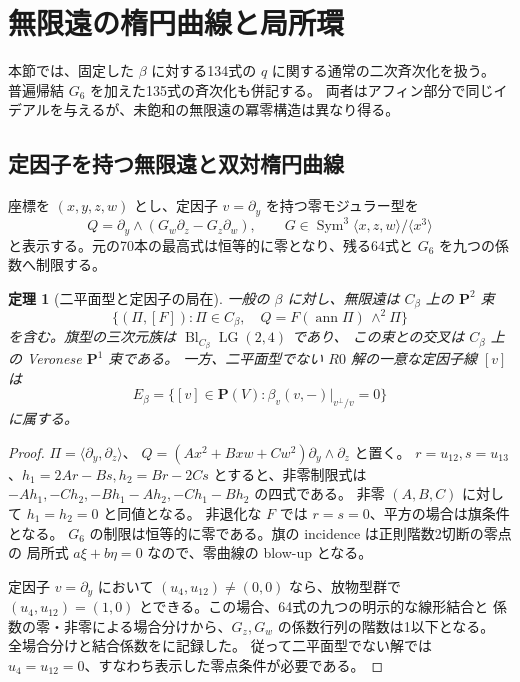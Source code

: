 \documentclass[11pt,a4paper]{ltjsarticle}
\newcommand{\PP}{\mathbf P}
\newtheorem{theorem}{定理}[section]
\theoremstyle{remark}
\begin{document}
\section{無限遠の楕円曲線と局所環}\label{sec:infinity-v32}
本節では、固定した $\beta$ に対する134式の $q$ に関する通常の二次斉次化を扱う。
普遍帰結 $G_6$ を加えた135式の斉次化も併記する。
両者はアフィン部分で同じイデアルを与えるが、未飽和の無限遠の冪零構造は異なり得る。

\subsection{定因子を持つ無限遠と双対楕円曲線}
座標を $(x,y,z,w)$ とし、定因子 $v=\partial_y$ を持つ零モジュラー型を
\[
 Q=\partial_y\wedge(G_w\partial_z-G_z\partial_w),\qquad
 G\in\operatorname{Sym}^3\langle x,z,w\rangle/\langle x^3\rangle
\]
と表示する。元の70本の最高式は恒等的に零となり、残る64式と $G_6$ を九つの係数へ制限する。

\begin{theorem}[二平面型と定因子の局在]
一般の $\beta$ に対し、無限遠は $C_\beta$ 上の $\PP^2$ 束
\[
 \{(\Pi,[F]):\Pi\in C_\beta,\quad
 Q=F(\operatorname{ann}\Pi)\,\wedge^2\Pi\}
\]
を含む。旗型の三次元族は $\operatorname{Bl}_{C_\beta}\operatorname{LG}(2,4)$ であり、
この束との交叉は $C_\beta$ 上の Veronese $\PP^1$ 束である。
一方、二平面型でない $R0$ 解の一意な定因子線 $[v]$ は
\[
 E_\beta=\{[v]\in\PP(V):\beta_v(v,-)|_{v^\perp/v}=0\}
\]
に属する。
\end{theorem}
\begin{proof}
$\Pi=\langle\partial_y,\partial_z\rangle$、
$Q=(Ax^2+Bxw+Cw^2)\partial_y\wedge\partial_z$ と置く。
$r=u_{12},s=u_{13}$、$h_1=2Ar-Bs,h_2=Br-2Cs$ とすると、非零制限式は
$-Ah_1,-Ch_2,-Bh_1-Ah_2,-Ch_1-Bh_2$ の四式である。
非零 $(A,B,C)$ に対して $h_1=h_2=0$ と同値となる。
非退化な $F$ では $r=s=0$、平方の場合は旗条件となる。
$G_6$ の制限は恒等的に零である。旗の incidence は正則階数2切断の零点の
局所式 $a\xi+b\eta=0$ なので、零曲線の blow-up となる。

定因子 $v=\partial_y$ において $(u_4,u_{12})\ne(0,0)$ なら、放物型群で
$(u_4,u_{12})=(1,0)$ とできる。この場合、64式の九つの明示的な線形結合と
係数の零・非零による場合分けから、$G_z,G_w$ の係数行列の階数は1以下となる。
全場合分けと結合係数を\cite{r0-v32}に記録した。
従って二平面型でない解では $u_4=u_{12}=0$、すなわち表示した零点条件が必要である。
\end{proof}
\end{document}
